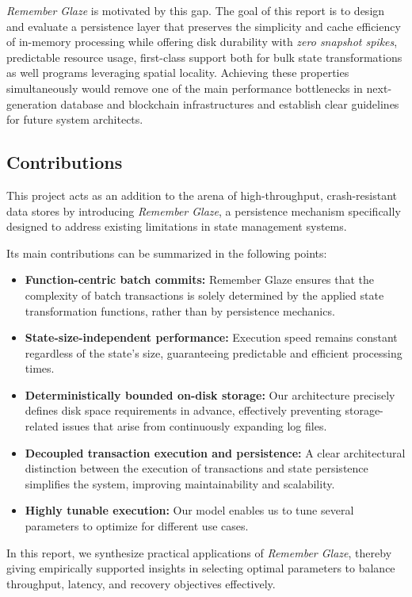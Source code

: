 \documentclass[conference]{IEEEtran}
\begin{document}
\textit{Remember Glaze} is motivated by this gap.  The goal of this report is to design and evaluate a persistence layer that preserves the simplicity and cache efficiency of in-memory processing while offering disk durability with \emph{zero snapshot spikes}, predictable resource usage, first-class support both for bulk state transformations as well programs leveraging spatial locality.  Achieving these properties simultaneously would remove one of the main performance bottlenecks in next-generation database and blockchain infrastructures and establish clear guidelines for
future system architects.

\subsection{Contributions}

This project acts as an addition to the arena of high-throughput, crash-resistant data stores by introducing \textit{Remember Glaze}, a persistence mechanism specifically designed to address existing limitations in state management systems.

Its main contributions can be summarized in the following points: 
\begin{itemize}
\item \textbf{Function-centric batch commits:} Remember Glaze ensures that the complexity of batch transactions is solely determined by the applied state transformation functions, rather than by persistence mechanics.
\item \textbf{State-size-independent performance:} Execution speed remains constant regardless of the state’s size, guaranteeing predictable and efficient processing times.
\item \textbf{Deterministically bounded on-disk storage:} Our architecture precisely defines disk space requirements in advance, effectively preventing storage-related issues that arise from continuously expanding log files.
\item \textbf{Decoupled transaction execution and persistence:} A clear architectural distinction between the execution of transactions and  state persistence simplifies the system, improving maintainability and scalability.
\item \textbf{Highly tunable execution:} Our model enables us to tune several parameters to optimize for different use cases. 
\end{itemize}
In this report, we synthesize practical applications of \textit{Remember Glaze}, thereby giving empirically supported insights in selecting optimal parameters to balance throughput, latency, and recovery objectives effectively.
\end{document}
